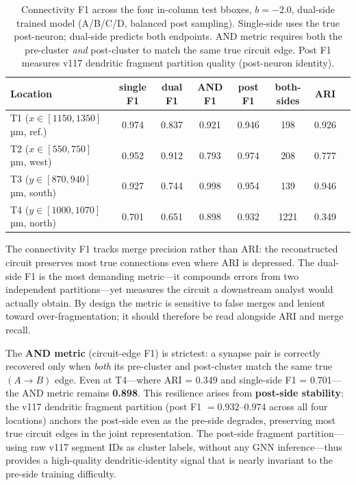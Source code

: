 \documentclass[10pt,letterpaper]{article}
\begin{document}
\begin{table}[h]
\centering
\caption{Connectivity F1 across the four in-column test bboxes, $b = -2.0$, dual-side
trained model (A/B/C/D, balanced post sampling). Single-side uses the true post-neuron;
dual-side predicts both endpoints. AND metric requires both the pre-cluster \emph{and}
post-cluster to match the same true circuit edge. Post F1 measures v117 dendritic
fragment partition quality (post-neuron identity).}
\label{tab:connectivity}
\small
\begin{tabular}{lccccccc}
\toprule
Location & single F1 & dual F1 & AND F1 & post F1 & both-sides & ARI \\
\midrule
T1 ($x\!\in\![1150,1350]$ µm, ref.) & 0.974 & 0.837 & 0.921 & 0.946 & 198  & 0.926 \\
T2 ($x\!\in\![550,750]$ µm, west)   & 0.952 & 0.912 & 0.793 & 0.974 & 208  & 0.777 \\
T3 ($y\!\in\![870,940]$ µm, south)  & 0.927 & 0.744 & 0.998 & 0.954 & 139  & 0.946 \\
T4 ($y\!\in\![1000,1070]$ µm, north) & 0.701 & 0.651 & 0.898 & 0.932 & 1221 & 0.349 \\
\bottomrule
\end{tabular}
\end{table}

The connectivity F1 tracks merge precision rather than ARI: the reconstructed circuit
preserves most true connections even where ARI is depressed. The
dual-side F1 is the most demanding metric---it compounds errors from two independent
partitions---yet measures the circuit a downstream analyst would actually obtain. By design
the metric is sensitive to false merges and lenient toward over-fragmentation; it should
therefore be read alongside ARI and merge recall.

The \textbf{AND metric} (circuit-edge F1) is strictest: a synapse pair is correctly
recovered only when \emph{both} its pre-cluster and post-cluster match the same true
$(A \to B)$ edge. Even at T4---where ARI = 0.349 and single-side F1 = 0.701---the AND
metric remains \textbf{0.898}. This resilience arises from \textbf{post-side stability}:
the v117 dendritic fragment partition (post F1 $= 0.932$--$0.974$ across all four
locations) anchors the post-side even as the pre-side degrades, preserving most true
circuit edges in the joint representation. The post-side fragment partition---using raw
v117 segment IDs as cluster labels, without any GNN inference---thus provides a
high-quality dendritic-identity signal that is nearly invariant to the pre-side training
difficulty.
\end{document}
